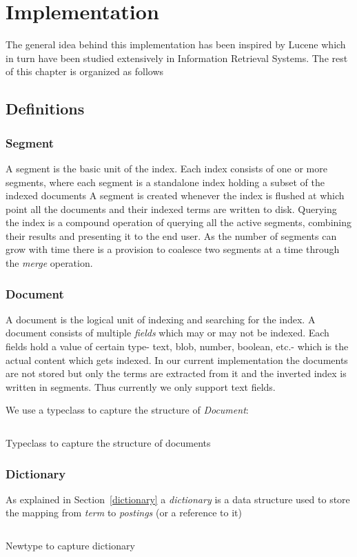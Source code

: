 \chapter{Implementation}
\label{chap:implementation}

The general idea behind this implementation has been inspired by Lucene\cite{goetz2000lucene}
which in turn have been studied extensively in Information Retrieval Systems.
The rest of this chapter is organized as follows

\section{Definitions}

\subsection{Segment}
A segment is the basic unit of the index.
Each index consists of one or more segments, where each segment is a standalone index holding a subset of the indexed documents\cite{mccandless2010lucene}
A segment is created whenever the index is flushed at which point all the documents and their indexed terms are written to disk.
Querying the index is a compound operation of querying all the active segments, combining their results and presenting it to the end user.
As the number of segments can grow with time there is a provision to coalesce two segments at a time through the \textit{merge} operation.

\subsection{Document}
A document is the logical unit of indexing and searching for the index.
A document consists of multiple \textit{fields} which may or may not be indexed.
Each fields hold a value of certain type- text, blob, number, boolean, etc.- which is the actual content which gets indexed.
In our current implementation the documents are not stored but only the terms are extracted from it and the inverted index is written in segments.
Thus currently we only support text fields.

We use a typeclass to capture the structure of \textit{Document}:
\begin{listing}
\inputminted{haskell}{hs/document.hs}
\caption{Typeclass to capture the structure of documents}
\end{listing}

\subsection{Dictionary}
As explained in Section~\ref{dictionary} a \textit{dictionary} is a data structure used to store the mapping from \textit{term} to \textit{postings} (or a reference to it)
\begin{listing}
\inputminted{haskell}{hs/dictionary.hs}
\caption{Newtype to capture dictionary}
\end{listing}

